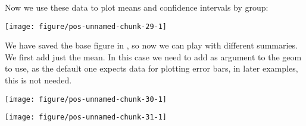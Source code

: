 \documentclass[paper=a4,10pt,div=17,headsepline,BCOR=12mm,twoside,open=right]{scrbook}\usepackage{knitr}
\begin{document}
Now we use these data to plot means and confidence intervals by group:

\begin{knitrout}\footnotesize
{}\color{fgcolor}\begin{kframe}
\begin{alltt}
 \hlkwb{<-} \hlstd{(} \hlstd{(}  \hlopt{+} \hlstd{()}
\end{alltt}
\end{kframe}

{\centering \texttt{[image: figure/pos-unnamed-chunk-29-1]} 

}



\end{knitrout}

We have saved the base figure in , so now we can play with different summaries. We first add just the mean. In this case we need to add as argument to  the geom to use, as the default one expects data for plotting error bars, in later examples, this is not needed.

\begin{knitrout}\footnotesize
{}\color{fgcolor}\begin{kframe}
\begin{alltt}
 \hlopt{+} \hlstd{(} \hlstd{=} \hlstd{,} \hlstd{=}\hlstd{,}
                    \hlstd{=}\hlstd{,} \hlstd{=}\hlstd{,} \hlstd{=}\hlstd{)}
\end{alltt}
\end{kframe}

{\centering \texttt{[image: figure/pos-unnamed-chunk-30-1]} 

}



\end{knitrout}

\begin{knitrout}\footnotesize
{}\color{fgcolor}\begin{kframe}
\begin{alltt}
 \hlopt{+} \hlstd{(} \hlstd{=} \hlstd{,} \hlstd{=}\hlstd{,}
                    \hlstd{=}\hlstd{,} \hlstd{=}\hlstd{,} \hlstd{=}\hlstd{)}
\end{alltt}
\end{kframe}

{\centering \texttt{[image: figure/pos-unnamed-chunk-31-1]} 

}



\end{knitrout}
\end{document}
